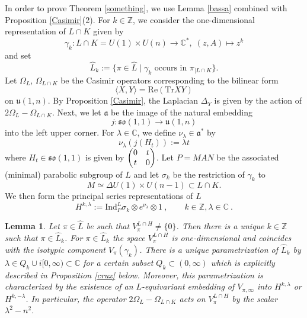 \documentclass[10]{amsart}
\newtheorem{lem}[thm]{Lemma}
\theoremstyle{remark}
\theoremstyle{definition}
\numberwithin{equation}{section}
\newcommand{\Tr}{\text{Tr}}
\newcommand{\Ind}{\text{Ind}}
\newcommand{\fa}{{\mathfrak a}}             %
\newcommand{\fl}{{\mathfrak l}}
\newcommand{\fo}{{\mathfrak{so}}}
\newcommand{\fu}{{\mathfrak u}}
\newcommand{\beu}{\begin{equation*}}
\newcommand{\defn}{{:=}}
\begin{document}
{In order to prove Theorem \ref{something}, we use Lemma \ref{bassa} combined with Proposition \ref{Casimir}(2). For $k\in\mathbb{Z}$, we consider the one-dimensional representation of $L\cap K$ given by
%
\beu
\gamma_k:L\cap K =U(1)\times U(n)\rightarrow \mathbb{C}^*,\;(z,A)\mapsto z^k
\end{equation*}
%
and set
%
\beu
\widehat L_k\defn\{\pi\in\widehat L\mid \gamma_k\mbox{ occurs in }\pi_{|L\cap K}\}.
\end{equation*}
%
Let $\Omega_L$, $\Omega_{L\cap K}$ be the  Casimir operators corresponding to the bilinear form 
$$\langle X,Y\rangle = \mathrm{Re} (\Tr XY)$$ 
on $\fu(1,n)$. By Proposition \ref{Casimir}, the Laplacian $\Delta_Y$ is given by the action of $2\Omega_L-\Omega_{L\cap K}$. Next, we let $\fa$ be the image 
of the natural embedding 
%
\beu
j:\fo(1,1)\rightarrow\fu(1,n)
\end{equation*} 
%
into the left upper corner. For $\lambda\in\mathbb{C}$, we define $\nu_\lambda\in\fa^*$ by 
%
\beu
\nu_\lambda (j(H_t))\defn \lambda t
\end{equation*}
%
where $H_t\in\fo(1,1)$ is given by
$\begin{pmatrix}
0&t\cr
t&0
\end{pmatrix}$. 
Let $P=MAN$ be the associated (minimal) parabolic subgroup of $L$ and let $\sigma_k$ be the restriction of $\gamma_k$ to 
%
\beu
M\simeq\Delta U(1)\times U(n-1)\subset L\cap K.
\end{equation*}
% 
We then form the principal series representations of $L$
$$ H^{k,\lambda}\defn\Ind_P^L\sigma_k\otimes e^{\nu_\lambda}\otimes 1\  ,\qquad k\in\mathbb{Z},\lambda\in\mathbb{C}\ .$$

\begin{lem}\label{bummi}
Let $\pi\in\widehat L$ be such that $V_\pi^{L\cap H}\ne\{0\}$. Then there is a unique $k\in\mathbb{Z}$ such that $\pi\in\widehat L_k$. 
For $\pi\in\widehat L_k$ the space $V_{\pi}^{L\cap H}$ is one-dimensional and coincides with the isotypic component 
$V_{\pi}(\gamma_k)$. There is a unique parametrization of $\widehat L_k$ by $\lambda\in Q_k\cup i[0,\infty)\subset \mathbb{C}$ 
for a certain subset $Q_k\subset (0,\infty)$ which is explicitly described in Proposition \ref{crux} below. Moreover, this parametrization is 
characterized by the existence of an $L$-equivariant embedding of $V_{\pi,\infty}$ into $H^{k,\lambda}$ or $H^{k,-\lambda}$. 
In particular, the operator $2\Omega_L-\Omega_{L\cap K}$ acts on $V_{\pi}^{L\cap H}$ 
by the scalar $\lambda^2-n^2$.
\end{lem}

}
\end{document}
